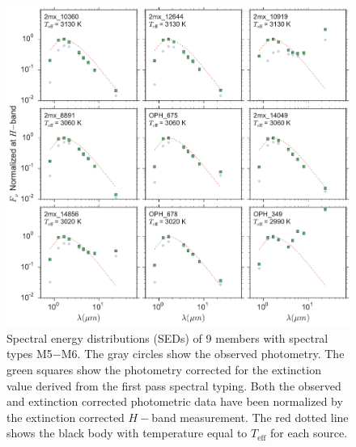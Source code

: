 \begin{figure}[ht!]
  \caption{ Spectral energy distributions (SEDs) of 9 members with spectral types M5$-$M6.  The gray circles show the observed photometry.  The green squares show the photometry corrected for the extinction value derived from the first pass spectral typing.  Both the observed and extinction corrected photometric data have been normalized by the extinction corrected $H-$band measurement.  The red dotted line shows the black body with temperature equal to $T_{\mathrm{eff}}$ for each source.  \label{fig_SEDs_9panel} }
\centering
\includegraphics[scale=0.6]{chIMACS/figures/SEDS_9panel}
\end{figure}

